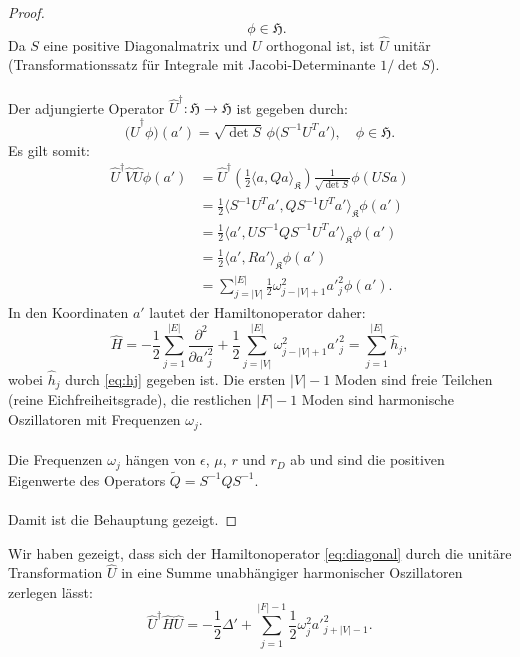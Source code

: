 \documentclass[11pt,a4paper,leqno]{report}
\numberwithin{equation}{chapter}
\begin{document}
\begin{proof}
\[	\quad \phi \in \mathfrak{H}.
	\]
	Da \(S\) eine positive Diagonalmatrix und \(U\) orthogonal ist, ist \(\hat{U}\) unitär 
	(Transformationssatz für Integrale mit Jacobi-Determinante \(1/\det S\)).\\
	\\
	Der adjungierte Operator \(\hat{U}^\dagger: \mathfrak{H} \to \mathfrak{H}\) ist gegeben durch:
	\[
	\bigl(\hat{U}^\dagger\phi\bigr)(a') = \sqrt{\det S} \, \phi\bigl(S^{-1}U^T a'\bigr), 
	\quad \phi \in \mathfrak{H}.
	\]
	Es gilt somit:
	\begin{align*}
		\hat{U}^\dagger \hat{V} \hat{U}\phi(a')
		&= \hat{U}^\dagger \left( \frac{1}{2}\bigl\langle a, Q a\bigr\rangle_{\mathfrak{K}} \right) 
		\frac{1}{\sqrt{\det S}}\phi(US a)\\
		&= \frac{1}{2}\bigl\langle S^{-1}U^T a', Q S^{-1}U^T a'\bigr\rangle_{\mathfrak{K}}\phi(a')\\
		&= \frac{1}{2}\bigl\langle a', U S^{-1} Q S^{-1}U^T a'\bigr\rangle_{\mathfrak{K}}\phi(a')\\
		&= \frac{1}{2}\bigl\langle a', R a'\bigr\rangle_{\mathfrak{K}} \phi(a')\\
		&= \sum_{j=|V|}^{|E|} \frac{1}{2} \omega_{j-|V|+1}^2 {a'}_j^2\phi(a').
	\end{align*}
	In den Koordinaten \(a'\) lautet der Hamiltonoperator daher:
	\[
	\hat{H} = -\frac{1}{2}\sum_{j=1}^{|E|} \frac{\partial^2}{\partial {a'}_j^2} 
	+ \frac{1}{2}\sum_{j=|V|}^{|E|} \omega_{j-|V|+1}^2 {a'}_j^2
	= \sum_{j=1}^{|E|} \hat{h}_j,
	\]
	wobei \(\hat{h}_j\) durch \eqref{eq:hj} gegeben ist. Die ersten \(|V|-1\) Moden sind 
	freie Teilchen (reine Eichfreiheitsgrade), die restlichen \(|F|-1\) Moden sind 
	harmonische Oszillatoren mit Frequenzen \(\omega_j\).\\
	\\
	Die Frequenzen \(\omega_j\) hängen von \(\epsilon\), \(\mu\), \(r\) und \(r_D\) ab und 
	sind die positiven Eigenwerte des Operators \(\tilde{Q} = S^{-1} Q S^{-1}\).\\
	\\
	Damit ist die Behauptung gezeigt.
\end{proof}
\noindent
Wir haben gezeigt, dass sich der Hamiltonoperator \eqref{eq:diagonal} durch die unitäre 
Transformation $\hat{U}$ in eine Summe unabhängiger harmonischer Oszillatoren zerlegen lässt:
\begin{equation*}
	\hat{U}^\dagger \hat{H} \hat{U} = -\frac{1}{2}\Delta' + \sum_{j=1}^{|F|-1} \frac{1}{2}\omega_j^2 {a'}_{j+|V|-1}^2.
\end{equation*}
\end{document}
